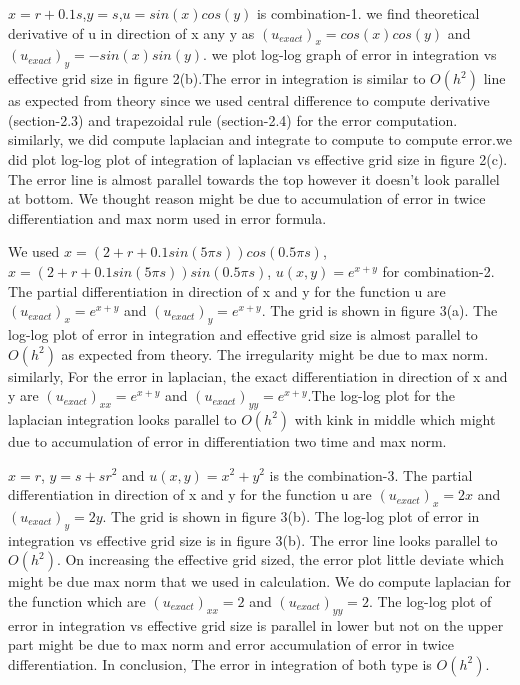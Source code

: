 \documentclass{article}
\begin{document}
$x = r + 0.1 s$,$y = s$,$u = sin(x)cos(y)$ is combination-1. we find theoretical derivative of u in direction of x any y as $(u_{exact})_x = cos(x)cos(y)$ and $(u_{exact})_y = -sin(x)sin(y)$. we plot log-log graph of error in integration vs effective grid size in figure 2(b).The error in integration is similar to $O(h^2)$ line  as expected from theory since we used central difference to compute derivative (section-2.3) and trapezoidal rule (section-2.4) for the error computation. similarly, we did compute laplacian and integrate to compute to compute error.we did plot log-log plot of integration of laplacian vs effective grid size in figure 2(c). The error line is almost parallel towards the top however it  doesn't look parallel at bottom. We thought reason might be due to accumulation of error in twice differentiation and max norm used in error formula.

We used $x=(2+r+0.1 sin(5\pi s))cos(0.5\pi s)$,$x=(2+r+0.1 sin(5\pi s))sin(0.5\pi s)$, $u(x,y)= e^{x+y}$ for combination-2. The partial differentiation in direction of x and y for the function u are $(u_{exact})_x=e^{x+y}$ and $(u_{exact})_y=e^{x+y}$. The grid is shown in figure 3(a). The log-log plot of error in integration and effective grid size is almost parallel to $O(h^2)$ as expected from theory. The irregularity might be due to max norm. similarly, For the error in laplacian, the exact differentiation in direction of x and y are $(u_{exact})_{xx}=e^{x+y}$ and $(u_{exact})_{yy}=e^{x+y}$.The log-log plot for the laplacian integration looks parallel to $O(h^2)$ with kink in middle which might due to accumulation of error in differentiation two time and max norm.

$x=r$, $y=s+sr^2$ and $u(x,y)=x^2+y^2$ is the combination-3. The partial differentiation in direction of x and y for the function u are $(u_{exact})_x=2x$ and $(u_{exact})_y=2y$. The grid is shown in figure 3(b). The log-log plot of error in integration vs effective grid size is in figure 3(b). The error line looks parallel to $O(h^2)$. On increasing the effective grid sized, the error plot little deviate which might be due max norm that we used in calculation. We do compute laplacian for the function which are $(u_{exact})_{xx}=2$ and $(u_{exact})_{yy}=2$. The log-log plot of error in integration vs effective grid size is parallel in lower but not on the upper part might be due to max norm and error accumulation of error in twice differentiation.
In conclusion, The error in integration of both type is $O(h^2)$.
\end{document}

